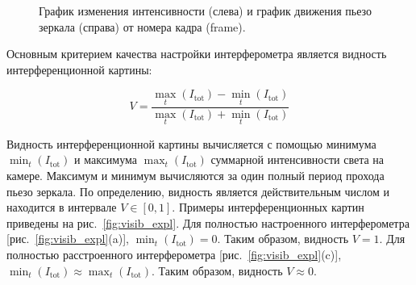 \begin{figure}[ht]
\caption{График изменения интенсивности (слева) и график движения пьезо зеркала (справа) от номера кадра (frame).}
\label{fig:intens_plot}
\end{figure}

Основным критерием качества настройки интерферометра является видность интерференционной картины: 

\begin{equation}
    V = \frac{            
        \max_{t}(I_{\mathrm{tot}}) - \min_t(I_{\mathrm{tot}})}
        {\max_{t}(I_{\mathrm{tot}}) + \min_t(I_{\mathrm{tot}})}
    \label{eq:visib}
\end{equation}

Видность интерференционной картины вычисляется с помощью минимума $\min_t(I_{\mathrm{tot}})$ и максимума $\max_t(I_{\mathrm{tot}})$ суммарной интенсивности света на камере. Максимум и минимум вычисляются за один полный период прохода пьезо зеркала. По определению, видность является действительным числом и находится в интервале $V \in [0, 1]$. Примеры интерференционных картин приведены на рис.~\ref{fig:visib_expl}. Для полностью настроенного интерферометра [рис.~\ref{fig:visib_expl}(a)], $\min_t(I_{\mathrm{tot}})=0$. Таким образом, видность $V=1$. Для полностью расстроенного интерферометра [рис.~\ref{fig:visib_expl}(c)], $\min_t(I_{\mathrm{tot}})\approx\max_t(I_{\mathrm{tot}})$. Таким образом, видность $V\approx 0$.


